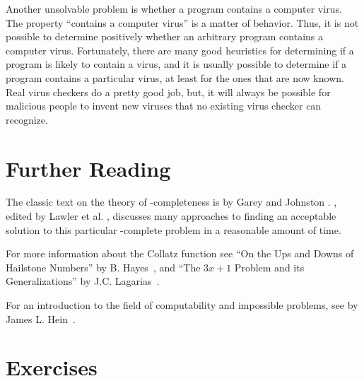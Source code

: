 Another unsolvable problem is whether a program contains a computer
virus.
The property ``contains a computer virus'' is a matter of behavior.
Thus, it is not possible to determine positively whether an arbitrary
program contains a computer virus.
Fortunately, there are many good heuristics for determining if a
program is likely to contain a virus, and it is usually possible to
determine if a program contains a particular virus, at least for the
ones that are now known.
Real virus checkers do a pretty good job,
but, it will always be possible for malicious people to invent new
viruses that no existing virus checker can recognize.

\section{Further Reading}

The classic text on the theory of \NP-completeness
is
 by Garey and Johnston \cite{GJ}.
, edited by Lawler et al.
\cite{Salesman}, discusses many approaches to finding an acceptable
solution to this particular \NP-complete problem in a reasonable
amount of time.

For more information about the Collatz function
see
``On the Ups and Downs of Hailstone Numbers'' by B. Hayes~\cite{Hayes84},
and ``The \(3x + 1\) Problem and its Generalizations'' by
J.C. Lagarias~\cite{Lagarias85}.

For an introduction to the field of
computability
and impossible problems, see  by James L. Hein~\cite{Hein}.

\section{Exercises}

